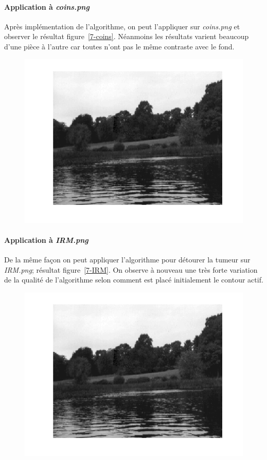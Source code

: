 \documentclass{article}
\begin{document}
\paragraph{Application à \emph{coins.png}}
Après implémentation de l'algorithme, on peut l'appliquer sur \emph{coins.png} et observer le résultat figure~\ref{7-coins}. Néanmoins les résultats varient beaucoup d'une pièce à l'autre car toutes n'ont pas le même contraste avec le fond.

\begin{figure}[!ht]
\includegraphics[width=\textwidth]{images/1/1-1-autumn_b.png}
\end{figure}

\paragraph{Application à \emph{IRM.png}}
De la même façon on peut appliquer l'algorithme pour détourer la tumeur sur \emph{IRM.png}; résultat figure~\ref{7-IRM}. On observe à nouveau une très forte variation de la qualité de l'algorithme selon comment est placé initialement le contour actif.

\begin{figure}[!ht]
\includegraphics[width=\textwidth]{images/1/1-1-autumn_b.png}
\end{figure}
\end{document}
